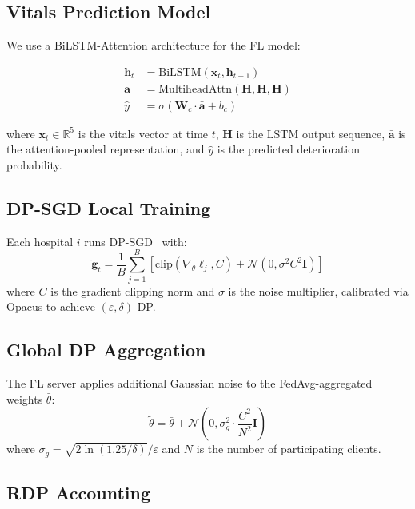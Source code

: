 \documentclass[10pt,journal,compsoc]{IEEEtran}
\begin{document}
\subsection{Vitals Prediction Model}

We use a BiLSTM-Attention architecture for the FL model:

\begin{align}
\mathbf{h}_t &= \text{BiLSTM}(\mathbf{x}_t, \mathbf{h}_{t-1}) \\
\mathbf{a}   &= \text{MultiheadAttn}(\mathbf{H}, \mathbf{H}, \mathbf{H}) \\
\hat{y}      &= \sigma\!\left(\mathbf{W}_c \cdot \bar{\mathbf{a}} + b_c\right)
\end{align}

where $\mathbf{x}_t \in \mathbb{R}^5$ is the vitals vector at time $t$,
$\mathbf{H}$ is the LSTM output sequence, $\bar{\mathbf{a}}$ is
the attention-pooled representation, and $\hat{y}$ is the predicted
deterioration probability.

\subsection{DP-SGD Local Training}

Each hospital $i$ runs DP-SGD~\cite{abadi2016} with:
\begin{equation}
\tilde{\mathbf{g}}_t = \frac{1}{B} \sum_{j=1}^{B}
  \left[ \text{clip}\!\left(\nabla_\theta \ell_j, C\right) +
         \mathcal{N}(0, \sigma^2 C^2 \mathbf{I}) \right]
\end{equation}
where $C$ is the gradient clipping norm and $\sigma$ is the
noise multiplier, calibrated via Opacus to achieve
$(\varepsilon, \delta)$-DP.

\subsection{Global DP Aggregation}

The FL server applies additional Gaussian noise to the
FedAvg-aggregated weights $\bar{\theta}$:
\begin{equation}
\tilde{\theta} = \bar{\theta} + \mathcal{N}\!\left(0,
  \sigma_g^2 \cdot \frac{C^2}{N^2} \mathbf{I}\right)
\end{equation}
where $\sigma_g = \sqrt{2\ln(1.25/\delta)} / \varepsilon$ and
$N$ is the number of participating clients.

\subsection{RDP Accounting}
\end{document}
